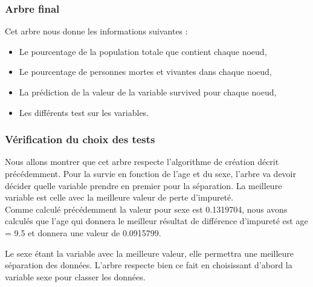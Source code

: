 \documentclass[compress]{beamer}
\begin{document}
\begin{frame}
\frametitle{Arbre final}
Cet arbre nous donne les informations suivantes : \newline
\begin{itemize}
 \item Le pourcentage de la population totale que contient chaque noeud,
 \item Le pourcentage de personnes mortes et vivantes dans chaque noeud,
 \item La prédiction de la valeur de la variable \textrm{survived} pour chaque noeud,
 \item Les différents test sur les variables.
\end{itemize}

\end{frame}
\begin{frame}
 \frametitle{Vérification du choix des tests}
Nous allons montrer que cet arbre respecte l'algorithme de création décrit précédemment. Pour la survie en fonction de l'age et du sexe, l'arbre va devoir décider quelle
variable prendre en premier pour la séparation. La meilleure variable est celle avec la meilleure valeur de perte d'impureté. \\
Comme calculé précédemment la valeur pour sexe est 0.1319704, nous avons calculés que l'age qui donnera le meilleur résultat de différence d'impureté est \textrm{age = 9.5} et donnera
une valeur de 0.0915799.\newline

Le sexe étant la variable avec la meilleure valeur, elle permettra une meilleure séparation des données. L'arbre respecte bien ce fait en choisissant d'abord la variable sexe pour
classer les données.
\end{frame}
\end{document}
